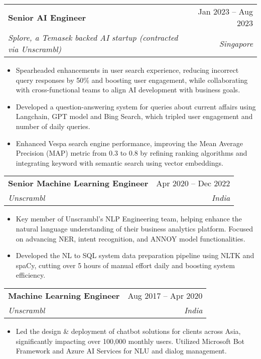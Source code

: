 \documentclass[letterpaper,11pt]{article}
\makeatletter
\newcommand{\resumeItem}[1]{
  \item\small{
    {#1 \vspace{-2pt}}
  }
}
\newcommand{\resumeSubheading}[4]{
  \vspace{-2pt}\item
    \begin{tabular*}{0.97\textwidth}[t]{l@{\extracolsep{\fill}}r}
      \textbf{#1} & #2 \\
      \textit{\small#3} & \textit{\small #4} \\
    \end{tabular*}\vspace{-7pt}
}
\newcommand{\resumeItemListStart}{\begin{itemize}}
\newcommand{\resumeItemListEnd}{\end{itemize}\vspace{-5pt}}
\makeatother
\begin{document}
    \resumeSubheading
    {Senior AI Engineer}{Jan 2023 -- Aug 2023}
    {Splore, a Temasek backed AI startup (contracted via Unscrambl)}{Singapore}
    \resumeItemListStart
      \resumeItem{Spearheaded enhancements in user search experience, reducing incorrect query responses by 50\% and boosting user engagement, while collaborating with cross-functional teams to align AI development with business goals.}
      \resumeItem{Developed a question-answering system for queries about current affairs using Langchain, GPT model and Bing Search, which tripled user engagement and number of daily queries.}
      \resumeItem{Enhanced Vespa search engine performance, improving the Mean Average Precision (MAP) metric from 0.3 to 0.8 by refining ranking algorithms and integrating keyword with semantic search using vector embeddings.}
    \resumeItemListEnd
  
    \resumeSubheading
      {Senior Machine Learning Engineer}{Apr 2020 -- Dec 2022}
      {Unscrambl}{India}
      \resumeItemListStart
      \resumeItem{Key member of Unscrambl's NLP Engineering team, helping enhance the natural language understanding of their business analytics platform. Focused on advancing NER, intent recognition, and ANNOY model functionalities.}
        \resumeItem{Developed the NL to SQL system data preparation pipeline using NLTK and spaCy, cutting over 5 hours of manual effort daily and boosting system efficiency.}
      \resumeItemListEnd

    \resumeSubheading
      {Machine Learning Engineer}{Aug 2017 -- Apr 2020}
      {Unscrambl}{India}
      \resumeItemListStart
        \resumeItem{Led the design \& deployment of chatbot solutions for clients across Asia, significantly impacting over 100,000 monthly users. 
        Utilized Microsoft Bot Framework and Azure AI Services for NLU and dialog management.}
    \resumeItemListEnd

\end{document}
